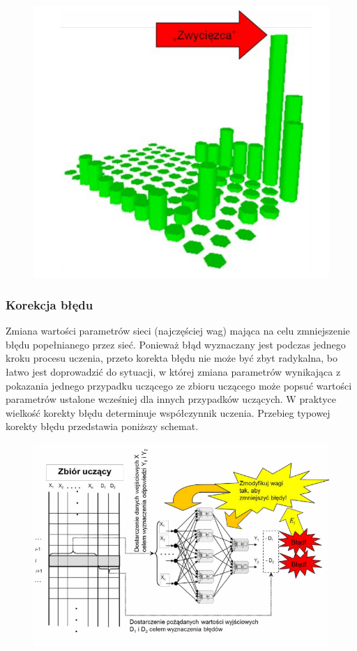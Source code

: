 \documentclass[11pt]{article}
\begin{document}
\begin{figure}[h!]
  \includegraphics{screeny/concept_winner.png}
\end{figure}

\hypertarget{korekcja-bux142ux119du}{%
\subsubsection{Korekcja błędu}\label{korekcja-bux142ux119du}}

Zmiana wartości parametrów sieci (najczęściej wag) mająca na celu
zmniejszenie błędu popełnianego przez sieć. Ponieważ błąd wyznaczany
jest podczas jednego kroku procesu uczenia, przeto korekta błędu nie
może być zbyt radykalna, bo łatwo jest doprowadzić do sytuacji, w której
zmiana parametrów wynikająca z pokazania jednego przypadku uczącego ze
zbioru uczącego może popsuć wartości parametrów ustalone wcześniej dla
innych przypadków uczących. W praktyce wielkość korekty błędu
determinuje współczynnik uczenia. Przebieg typowej korekty błędu
przedstawia poniższy schemat.

\begin{figure}[h!]
  \includegraphics{screeny/corection_fault.png}
\end{figure}
\end{document}

